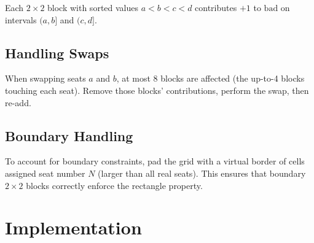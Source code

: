 \documentclass[11pt,a4paper]{article}
\begin{document}
Each $2 \times 2$ block with sorted values $a < b < c < d$ contributes $+1$ to $\text{bad}$ on intervals $(a, b]$ and $(c, d]$.

\subsection{Handling Swaps}

When swapping seats $a$ and $b$, at most 8 blocks are affected (the up-to-4 blocks touching each seat). Remove those blocks' contributions, perform the swap, then re-add.

\subsection{Boundary Handling}

To account for boundary constraints, pad the grid with a virtual border of cells assigned seat number $N$ (larger than all real seats). This ensures that boundary $2 \times 2$ blocks correctly enforce the rectangle property.

\section{Implementation}
\end{document}
